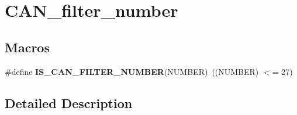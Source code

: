 \hypertarget{group___c_a_n__filter__number}{\section{C\-A\-N\-\_\-filter\-\_\-number}
\label{group___c_a_n__filter__number}
}
\subsection*{Macros}
\begin{DoxyCompactItemize}
\item 
\hypertarget{group___c_a_n__filter__number_ga28d6c98a160d71059ed9a5973de2a4ef}{\#define {\bfseries I\-S\-\_\-\-C\-A\-N\-\_\-\-F\-I\-L\-T\-E\-R\-\_\-\-N\-U\-M\-B\-E\-R}(N\-U\-M\-B\-E\-R)~((N\-U\-M\-B\-E\-R) $<$= 27)}\label{group___c_a_n__filter__number_ga28d6c98a160d71059ed9a5973de2a4ef}

\end{DoxyCompactItemize}


\subsection{Detailed Description}
